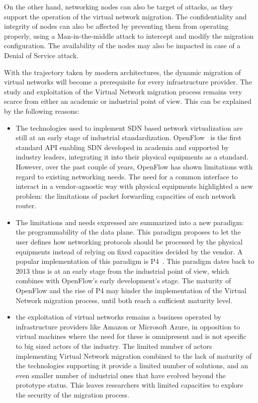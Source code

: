 On the other hand, networking nodes can also be target of attacks, as they support the operation of the virtual network migration.
The confidentiality and integrity of nodes can also be affected by preventing them from operating properly, \eg using a Man-in-the-middle attack to intercept and modify the migration configuration. The availability of the nodes may also be impacted in case of a Denial of Service attack.

With the trajectory taken by modern architectures, the dynamic migration of virtual networks will become a prerequisite for every infrastructure provider.
The study and exploitation of the Virtual Network migration process remains very scarce from either an academic or industrial point of view. This can be explained by the following reasons:

\begin{itemize}
    \item The technologies used to implement SDN based network virtualization are still at an early stage of industrial standardization. OpenFlow~\cite{Openflow-McKeown2008} is the first standard API enabling SDN developed in academia and supported by industry leaders, integrating it into their physical equipments as a standard. However, over the past couple of years, OpenFlow has shown limitations with regard to existing networking needs. The need for a common interface to interact in a vendor-agnostic way with physical equipments highlighted a new problem: the limitations of packet forwarding capacities of each network router. 
    
    \item The limitations and needs expressed are summarized into a new paradigm: the programmability of the data plane.
    This paradigm proposes to let the user defines how networking protocols should be processed by the physical equipments instead of relying on fixed capacities decided by the vendor. A popular implementation of this paradigm is P4~\cite{P4}.
    This paradigm dates back to 2013 thus is at an early stage from the industrial point of view, which combines with OpenFlow's early development's stage.
    The maturity of OpenFlow and the rise of P4 may hinder the implementation of the Virtual Network migration process, until both reach a sufficient maturity level.
    
    \item the exploitation of virtual networks remains a business operated by infrastructure providers like Amazon or Microsoft Azure, in opposition to virtual machines where the need for these is omnipresent and is not specific to big sized actors of the industry. The limited number of actors implementing Virtual Network migration combined to the lack of maturity of the technologies supporting it provide a limited number of solutions, and an even smaller number of industrial ones that have evolved beyond the prototype status. This leaves researchers with limited capacities to explore the security of the migration process.
\end{itemize}

